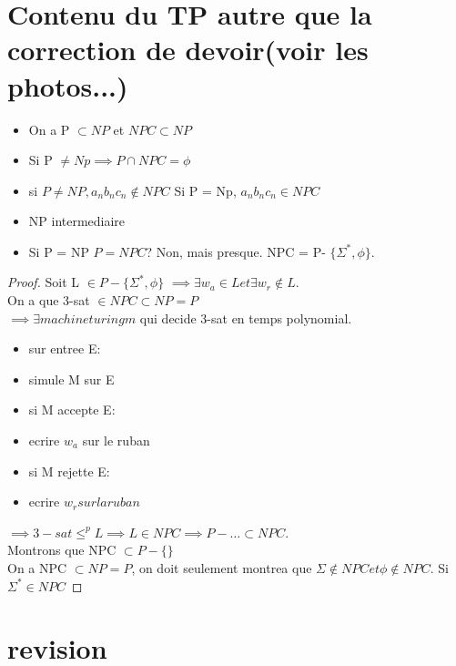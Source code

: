 \documentclass[a4paper]{article}
\begin{document}
\section*{Contenu du TP autre que la correction de devoir(voir les photos...)}
\begin{itemize}
	\item On a  P $\subset NP$ et $NPC \subset NP$ 
	\item Si P $\neq Np \implies P \cap  NPC = \phi$
	\item si $P \neq NP, a_{n}b_{n}c_{n} \not\in NPC$ Si P = Np, $a_{n}b_{n}c_{n} \in NPC$
	\item NP intermediaire
	\item Si P = NP $P = NPC$? Non, mais presque. NPC = P- $\{\Sigma^{*}, \phi\} $.
		
\end{itemize}
\begin{proof}
	Soit L $\in  P - \{\Sigma^{*}, \phi\} $ $\implies \exists w_{a} \in L et \exists w_{r} \not\in L$.\\
	On a que 3-sat $\in NPC \subset  NP = P$ \\
	$\implies \exists machine turing m$ qui decide 3-sat en temps polynomial.\\
	\begin{itemize}
		\item sur entree E:
		\item[] \qquad simule M sur E
		\item[] \qquad si M accepte E:
		\item[] \qquad\qquad ecrire $w_{a}$ sur le ruban
		\item[] \qquad si M rejette E:
		\item[] \qquad\qquad ecrire $w_{r} sur la ruban$
	\end{itemize}
	$\implies 3-sat \le^{p} L \implies L \in  NPC \implies P-\ldots \subset NPC$.\\
	Montrons que NPC $\subset  P-\{\} $\\
	On a NPC $\subset  NP = P$, on doit seulement montrea que $\Sigma \not\in  NPC et \phi \not\in NPC$. Si $\Sigma^{*} \in NPC $
	
\end{proof}

\section{revision}
\end{document}
